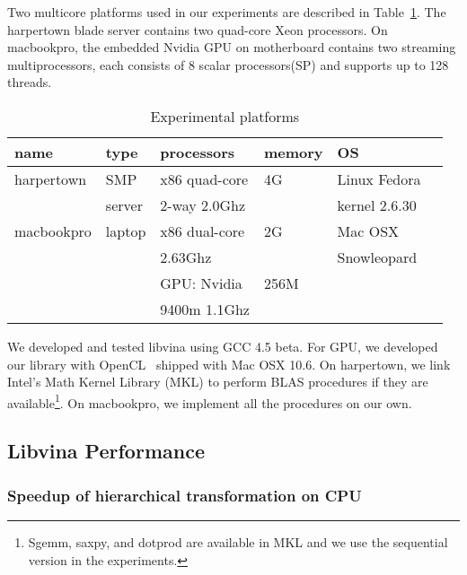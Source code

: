 Two multicore platforms used in our experiments are described in Table~\ref{tbl:mach}.
The harpertown blade server contains two quad-core Xeon processors. 
On macbookpro, the embedded Nvidia GPU on motherboard contains two streaming multiprocessors,
each consists of 8 scalar processors(SP) and supports up to 128 threads.

\begin{table}[hbt]
\caption{Experimental platforms}\label{tbl:mach}
\begin{center}
\begin{tabular}{|l|l|l|l|l|r|}
\hline
\textbf{name}&\textbf{type}&\textbf{processors}&\textbf{memory}&\textbf{OS}\\
\hline
harpertown&SMP &x86 quad-core  &4G&Linux Fedora\\
                  &  server &   
2-way  2.0Ghz & &kernel 2.6.30\\
\hline
macbookpro&laptop &x86 dual-core &2G&Mac OSX\\
                    &            & 2.63Ghz         &  &Snowleopard\\
\cline{3-4}
                   &             &GPU: Nvidia      &256M & \\
                    &            &9400m 1.1Ghz     & &\\
\hline
\end{tabular} 
\end{center}
\end{table}

We developed and tested libvina using GCC 4.5 beta.  For GPU, we developed
our library with OpenCL~\cite{opencl} shipped with Mac OSX 10.6. 
On harpertown, we link Intel's Math Kernel Library (MKL) to perform BLAS procedures
if they are available\footnote{Sgemm, saxpy, and dotprod are available
in MKL and we use the sequential version in the experiments.}.
On macbookpro, we implement all the procedures on our own. 


\subsection{Libvina Performance}


\subsubsection{Speedup of hierarchical transformation on CPU}
\label{exp:1}

